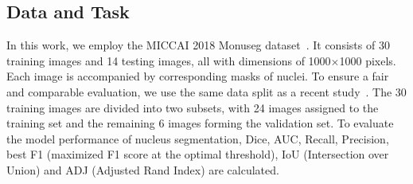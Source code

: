 \documentclass[conference]{IEEEtran}
\begin{document}
\subsection{Data and Task}
In this work, we employ the MICCAI 2018 Monuseg dataset~\cite{kumar2019multi}. It consists of 30 training images and 14 testing images, all with dimensions of 1000$\times$1000 pixels. Each image is accompanied by corresponding masks of nuclei. To ensure a fair and comparable evaluation, we use the same data split as a recent study~\cite{li2022lvit}. The 30 training images are divided into two subsets, with 24 images assigned to the training set and the remaining 6 images forming the validation set. To evaluate the model performance of nucleus segmentation, Dice, AUC, Recall, Precision, best F1 (maximized F1 score at the optimal threshold), IoU (Intersection over Union) and ADJ (Adjusted Rand Index) are calculated. 
\end{document}
